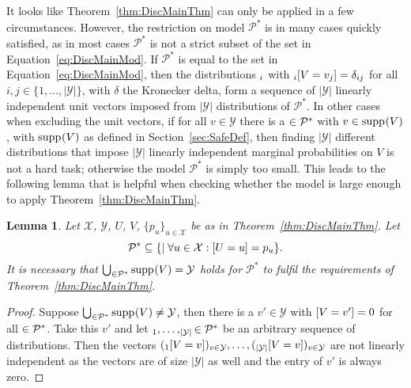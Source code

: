 \documentclass[a4paper]{report}
\theoremstyle{plain}
\newtheorem{lemma}[theorem]{Lemma}
\theoremstyle{definition}
\theoremstyle{remark}
\numberwithin{equation}{chapter}
\let\P\relax
\DeclareMathOperator{\P}{\mathbb{P}}
\DeclareMathOperator{\1}{\mathbbm{1}}
\newcommand{\X}{\mathcal{X}}
\newcommand{\Y}{\mathcal{Y}}
\DeclareMathOperator{\supp}{supp}
\newcommand{\Pmod}{\mathcal{P}^*}
\begin{document}
It looks like Theorem~\ref{thm:DiscMainThm} can only be applied in a few circumstances. However, the restriction on model $\Pmod$ is in many cases quickly satisfied, as in most cases $\Pmod$ is not a strict subset of the set in Equation~\ref{eq:DiscMainMod}. If $\Pmod$ is equal to the set in Equation~\ref{eq:DiscMainMod}, then the distributions $\P_i$ with $\P_i[V=v_j]=\delta_{ij}$ for all $i,j\in\{1,\ldots,|\Y|\}$, with $\delta$ the Kronecker delta, form a sequence of $|\Y|$ linearly independent unit vectors imposed from $|\Y|$ distributions of $\Pmod$. In other cases when excluding the unit vectors, if for all $v\in\Y$ there is a $\P\in\Pmod$ with $v\in\supp_{\P}(V)$, with $\supp_{\P}(V)$ as defined in Section~\ref{sec:SafeDef}, then finding $|\Y|$ different distributions that impose $|\Y|$ linearly independent marginal probabilities on $V$ is not a hard task; otherwise the model $\Pmod$ is simply too small. This leads to the following lemma that is helpful when checking whether the model is large enough to apply Theorem~\ref{thm:DiscMainThm}.
\begin{lemma}\label{lem:DiscMainReq}
Let $\X$, $\Y$, $U$, $V$, $\{p_u\}_{u\in\X}$ be as in Theorem~\ref{thm:DiscMainThm}.  Let
\begin{equation}
\Pmod\subseteq\{\P\mid\forall u\in\X:\P[U=u]=p_u\}.
\end{equation}
It is necessary that $\bigcup_{\P\in\Pmod}\supp_{\P}(V)=\Y$ holds for $\Pmod$ to fulfil the requirements of Theorem~\ref{thm:DiscMainThm}.
\end{lemma}
\begin{proof}
Suppose $\bigcup_{\P\in\Pmod}\supp_{\P}(V)\neq\Y$, then there is a $v'\in\Y$ with $\P[V=v']=0$ for all $\P\in\Pmod$. Take this $v'$ and let $\P_1,\ldots,\P_{|\Y|}\in\Pmod$ be an arbitrary sequence of distributions. Then the vectors $(\P_1[V=v])_{v\in\Y},\ldots,(\P_{|\Y|}[V=v])_{v\in\Y}$ are not linearly independent as the vectors are of size $|\Y|$ as well and the entry of $v'$ is always zero.
\end{proof}
\end{document}
